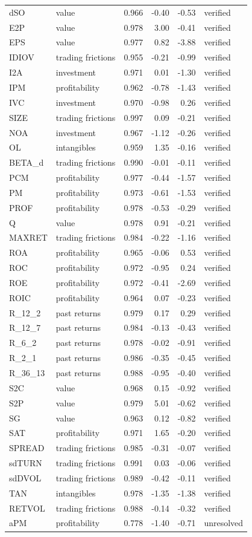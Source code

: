 \documentclass[11pt]{article}
\newcommand{\ok}{\textcolor{black!60}{verified}}
\newcommand{\bad}{\textcolor{red!70!black}{unresolved}}
\begin{document}
{\begin{longtable}{llrrrl}
dSO & value & 0.966 & -0.40 & -0.53 & \ok\\
E2P & value & 0.978 & 3.00 & -0.41 & \ok\\
EPS & value & 0.977 & 0.82 & -3.88 & \ok\\
IDIOV & trading frictions & 0.955 & -0.21 & -0.99 & \ok\\
I2A & investment & 0.971 & 0.01 & -1.30 & \ok\\
IPM & profitability & 0.962 & -0.78 & -1.43 & \ok\\
IVC & investment & 0.970 & -0.98 & 0.26 & \ok\\
SIZE & trading frictions & 0.997 & 0.09 & -0.21 & \ok\\
NOA & investment & 0.967 & -1.12 & -0.26 & \ok\\
OL & intangibles & 0.959 & 1.35 & -0.16 & \ok\\
BETA\_d & trading frictions & 0.990 & -0.01 & -0.11 & \ok\\
PCM & profitability & 0.977 & -0.44 & -1.57 & \ok\\
PM & profitability & 0.973 & -0.61 & -1.53 & \ok\\
PROF & profitability & 0.978 & -0.53 & -0.29 & \ok\\
Q & value & 0.978 & 0.91 & -0.21 & \ok\\
MAXRET & trading frictions & 0.984 & -0.22 & -1.16 & \ok\\
ROA & profitability & 0.965 & -0.06 & 0.53 & \ok\\
ROC & profitability & 0.972 & -0.95 & 0.24 & \ok\\
ROE & profitability & 0.972 & -0.41 & -2.69 & \ok\\
ROIC & profitability & 0.964 & 0.07 & -0.23 & \ok\\
R\_12\_2 & past returns & 0.979 & 0.17 & 0.29 & \ok\\
R\_12\_7 & past returns & 0.984 & -0.13 & -0.43 & \ok\\
R\_6\_2 & past returns & 0.978 & -0.02 & -0.91 & \ok\\
R\_2\_1 & past returns & 0.986 & -0.35 & -0.45 & \ok\\
R\_36\_13 & past returns & 0.988 & -0.95 & -0.40 & \ok\\
S2C & value & 0.968 & 0.15 & -0.92 & \ok\\
S2P & value & 0.979 & 5.01 & -0.62 & \ok\\
SG & value & 0.963 & 0.12 & -0.82 & \ok\\
SAT & profitability & 0.971 & 1.65 & -0.20 & \ok\\
SPREAD & trading frictions & 0.985 & -0.31 & -0.07 & \ok\\
sdTURN & trading frictions & 0.991 & 0.03 & -0.06 & \ok\\
sdDVOL & trading frictions & 0.989 & -0.42 & -0.11 & \ok\\
TAN & intangibles & 0.978 & -1.35 & -1.38 & \ok\\
RETVOL & trading frictions & 0.988 & -0.14 & -0.32 & \ok\\
aPM & profitability & 0.778 & -1.40 & -0.71 & \bad\\
\bottomrule
\end{longtable}}
\end{document}
